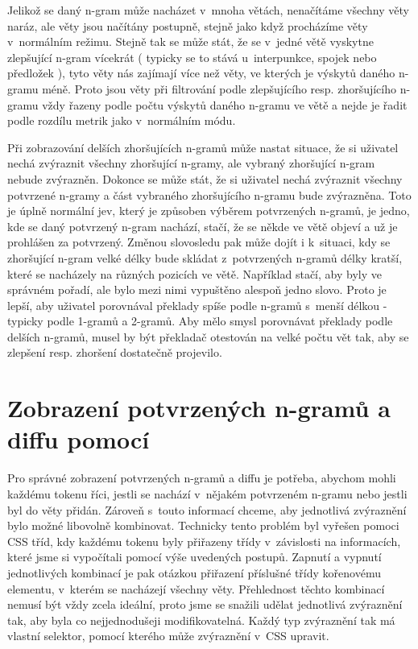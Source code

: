 Jelikož se daný \mbox{n-gram} může nacházet v~mnoha větách,
  nenačítáme všechny věty naráz,
  ale věty jsou načítány postupně,
  stejně jako když procházíme věty v~normálním režimu.
Stejně tak se může stát,
  že se v~jedné větě vyskytne zlepšující \mbox{n-gram} vícekrát
  ( typicky se to stává u~interpunkce, spojek nebo předložek ),
  tyto věty nás zajímají více než věty,
  ve kterých je výskytů daného \mbox{n-gramu} méně.
Proto jsou věty při filtrování podle zlepšujícího resp. zhoršujícího \mbox{n-gramu} vždy řazeny podle počtu výskytů daného \mbox{n-gramu} ve větě
  a nejde je řadit podle rozdílu metrik jako v~normálním módu.

Při zobrazování delších zhoršujících \mbox{n-gramů} může nastat situace,
  že si uživatel nechá zvýraznit všechny zhoršující \mbox{n-gramy},
  ale vybraný zhoršující \mbox{n-gram} nebude zvýrazněn.
Dokonce se může stát, 
  že si uživatel nechá zvýraznit všechny potvrzené \mbox{n-gramy}
  a část vybraného zhoršujícího \mbox{n-gramu} bude zvýrazněna.
Toto je úplně normální jev,
  který je způsoben výběrem potvrzených \mbox{n-gramů},
  je jedno, kde se daný potvrzený \mbox{n-gram} nachází,
  stačí,
  že se někde ve větě objeví a už je prohlášen za potvrzený.
Změnou slovosledu pak může dojít i k~situaci,
  kdy se zhoršující \mbox{n-gram} velké délky bude skládat z~potvrzených \mbox{n-gramů} délky kratší,
  které se nacházely na různých pozicích ve větě. 
Například stačí, aby byly ve správném pořadí,
  ale bylo mezi nimi vypuštěno alespoň jedno slovo.
Proto je lepší,
  aby uživatel porovnával překlady spíše podle \mbox{n-gramů} s~menší délkou -
  typicky podle 1-gramů a 2-gramů.
Aby mělo smysl porovnávat překlady podle delších \mbox{n-gramů},
  musel by být překladač otestován na velké počtu vět tak,
  aby se zlepšení resp. zhoršení dostatečně projevilo.

\section{Zobrazení potvrzených \mbox{n-gramů} a diffu pomocí}
Pro správné zobrazení potvrzených \mbox{n-gramů} a diffu je potřeba,
  abychom mohli každému tokenu říci,
  jestli se nachází v~nějakém potvrzeném \mbox{n-gramu} nebo jestli byl do věty přidán.
Zároveň s~touto informací chceme,
  aby jednotlivá zvýraznění bylo možné libovolně kombinovat.
Technicky tento problém byl vyřešen pomoci CSS tříd,
  kdy každému tokenu byly přiřazeny třídy v~závislosti na informacích,
  které jsme si vypočítali pomocí výše uvedených postupů.
Zapnutí a vypnutí jednotlivých kombinací je pak otázkou přiřazení příslušné třídy kořenovému elementu,
  v~kterém se nacházejí všechny věty.
Přehlednost těchto kombinací nemusí být vždy zcela ideální, 
  proto jsme se snažili udělat jednotlivá zvýraznění tak,
  aby byla co nejjednodušeji modifikovatelná.
Každý typ zvýraznění tak má vlastní selektor,
  pomocí kterého může zvýraznění v~CSS upravit.

